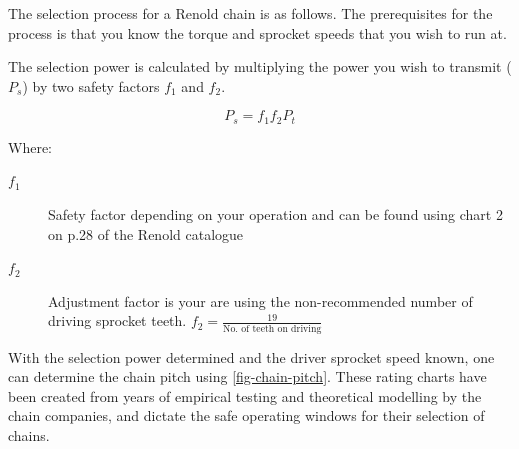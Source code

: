 The selection process for a Renold chain is as follows. The prerequisites for the process is that you know the torque and sprocket speeds that you wish to run at.


The selection power is calculated by multiplying the power you wish to transmit (\(P_s\)) by two safety factors \(f_1\) and \(f_2\).

\begin{equation}
  P_s = f_1f_2P_t
\end{equation}

\noindent Where:

\begin{description}
  \item[\(f_1\)] Safety factor depending on your operation and can be found using chart 2 on p.28 of the Renold catalogue
  \item[\(f_2\)] Adjustment factor is your are using the non-recommended number of driving sprocket teeth. \(f_2=\frac{19}{\text{No. of teeth on driving}}\)
\end{description}

With the selection power determined and the driver sprocket speed known, one can determine the chain pitch using \cref{fig-chain-pitch}. These rating charts have been created from years of empirical testing and theoretical modelling by the chain companies, and dictate the safe operating windows for their selection of chains.

